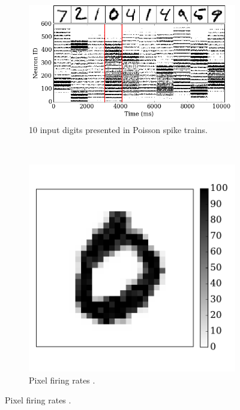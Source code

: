 		\begin{figure}[htbp!]
		\centering
		\begin{subfigure}[t]{0.65\textwidth}
			\includegraphics[width=\textwidth]{pics_iconip/6-1.png}
			\caption{10 input digits presented in Poisson spike trains.}
			\label{Fig:61}
		\end{subfigure}\\
		\begin{subfigure}[t]{0.3\textwidth}
			\includegraphics[width=\textwidth]{pics_iconip/6-2.pdf}
			\caption{Pixel firing rates \DIFaddbeginFL {}\DIFaddendFL .}
			\label{Fig:62}
		\end{subfigure}

\end{figure}
